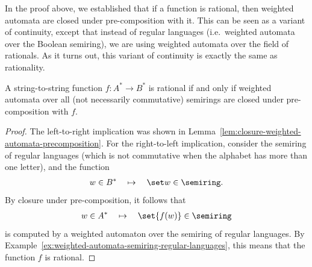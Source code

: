 In the proof above, we established that if a function is rational, then weighted automata are closed under pre-composition with it. This can be seen as a variant of continuity, except that instead of regular languages  (i.e.~weighted automata over the Boolean semiring), we are using weighted automata over the field of rationals. As it turns out, this variant of continuity is exactly the same as rationality.
\begin{theorem}\label{thm:characterisation-rational-functions-weighted-automata}
    A string-to-string function $f : A^* \to B^*$ is rational if and only if weighted automata over all (not necessarily commutative) semirings are closed under pre-composition with $f$.
\end{theorem}
\begin{proof}
    The left-to-right implication was shown in Lemma~\ref{lem:closure-weighted-automata-precomposition}. For the right-to-left implication, consider the semiring of regular languages (which is not commutative when the alphabet has more than one letter), and the  function 
    \begin{align*}
    w \in  B^*  \quad \mapsto \quad \set w \in \semiring.
    \end{align*}
    By closure under pre-composition, it follows that 
    \begin{align*}
    w \in A^* \quad \mapsto \quad \set{f(w)} \in \semiring
    \end{align*}
    is computed by a weighted automaton over the semiring of regular languages. By Example~\ref{ex:weighted-automata-semiring-regular-languages}, this means that the function $f$ is rational.
\end{proof}

